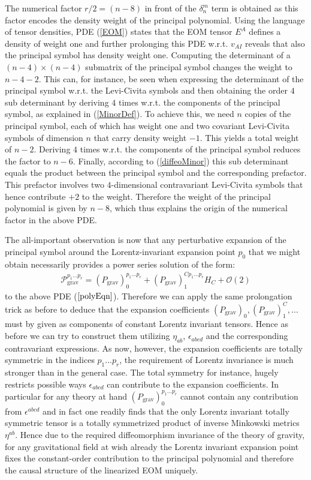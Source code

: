 The numerical factor $r/2 = (n-8)$ in front of the $\delta^m_n$ term is obtained as this factor encodes the density weight of the principal polynomial. Using the language of tensor densities, PDE (\ref{EOM}) states that the EOM tensor $E^A$ defines a density of weight one and further prolonging this PDE w.r.t. $v_{AI}$ reveals that also the principal symbol has density weight one. Computing the determinant of a $(n-4) \times (n-4)$ submatrix of the principal symbol changes the weight to $n-4-2$. This can, for instance, be seen when expressing the determinant of the principal symbol w.r.t. the Levi-Civita symbols and then obtaining the order $4$ sub determinant by deriving $4$ times w.r.t. the components of the principal symbol, as explained in (\ref{MinorDef}). To achieve this, we need $n$ copies of the principal symbol, each of which has weight one and two covariant Levi-Civita symbols of dimension $n$ that carry density weight $-1$. This yields a total weight of $n-2$. Deriving $4$ times w.r.t. the components of the principal symbol reduces the factor to $n-6$. Finally, according to (\ref{diffeoMinor}) this sub determinant equals the product between the principal symbol and the corresponding prefactor. This prefactor involves two $4$-dimensional contravariant Levi-Civita symbols that hence contribute $+2$ to the weight. Therefore the weight of the principal polynomial is given by $n-8$, which thus explains the origin of the numerical factor in the above PDE. 

The all-important observation is now that any perturbative expansion of the principal symbol around the Lorentz-invariant expansion point $p_0$ that we might obtain necessarily provides a power series solution of the form:
\begin{align}
    \mathcal{P}_{\text{grav}}^{{p_1}...{p_{r}}} = (P_{\text{grav}})^{{p_1}...{p_{r}}}_0 + (P_{\text{grav}})_1^{C{p_1}...{p_{r}}} H_C + \mathcal{O}(2)
\end{align}
to the above PDE ($\ref{polyEqn}$). Therefore we can apply the same prolongation trick as before to deduce that the expansion coefficients $(P_{\text{grav}})_0, (P_{\text{grav}})_1^C,...$ must by given as components of constant Lorentz invariant tensors. Hence as before we can try to construct them utilizing $\eta_{ab}$, $\epsilon_{abcd}$ and the corresponding contravariant expressions. As now, however, the expansion coefficients are totally symmetric in the indices $p_1...p_r$, the requirement of Lorentz invariance is much stronger than in the general case. The total symmetry for instance, hugely restricts possible ways $\epsilon_{abcd}$ can contribute to the expansion coefficients. In particular for any theory at hand $(P_{\text{grav}})_0^{{p_1}...{p_{r}}}$ cannot contain any contribution from $\epsilon^{abcd}$ and in fact one readily finds that the only Lorentz invariant totally symmetric tensor is a totally symmetrized product of inverse Minkowski metrics $\eta^{ab}$. Hence due to the required diffeomorphism invariance of the theory of gravity, for any gravitational field at wish already the Lorentz invariant expansion point fixes the constant-order contribution to the principal polynomial and therefore the causal structure of the linearized EOM uniquely.

